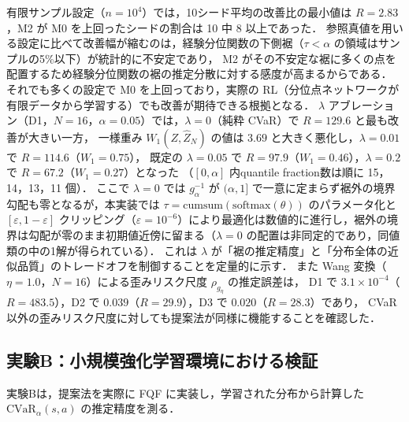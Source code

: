 \documentclass[a4paper,10pt]{jsarticle}
\theoremstyle{definition}
\newcommand{\CVaR}{\mathrm{CVaR}}
\newcommand{\Wone}{W_1}
\begin{document}
有限サンプル設定（$n=10^4$）では，10シード平均の改善比の最小値は $R=2.83$，M2 が M0 を上回ったシードの割合は 10 中 8 以上であった．
参照真値を用いる設定に比べて改善幅が縮むのは，経験分位関数の下側裾（$\tau<\alpha$ の領域はサンプルの5\%以下）が統計的に不安定であり，
M2 がその不安定な裾に多くの点を配置するため経験分位関数の裾の推定分散に対する感度が高まるからである．
それでも多くの設定で M0 を上回っており，実際の RL（分位点ネットワークが有限データから学習する）でも改善が期待できる根拠となる．
$\lambda$ アブレーション（D1，$N=16$，$\alpha=0.05$）では，$\lambda=0$（純粋 CVaR）で $R=129.6$ と最も改善が大きい一方，
一様重み $\Wone(Z,\hat Z_N)$ の値は $3.69$ と大きく悪化し，$\lambda=0.01$ で $R=114.6$（$\Wone=0.75$），
既定の $\lambda=0.05$ で $R=97.9$（$\Wone=0.46$），$\lambda=0.2$ で $R=67.2$（$\Wone=0.27$）となった
（$[0,\alpha]$ 内quantile fraction数は順に 15，14，13，11 個）．
ここで $\lambda=0$ では $g_\alpha^{-1}$ が $(\alpha,1]$ で一意に定まらず裾外の境界勾配も零となるが，本実装では $\tau=\mathrm{cumsum}(\mathrm{softmax}(\theta))$ のパラメータ化と $[\varepsilon,1-\varepsilon]$ クリッピング（$\varepsilon=10^{-6}$）により最適化は数値的に進行し，裾外の境界は勾配が零のまま初期値近傍に留まる（$\lambda=0$ の配置は非同定的であり，同値類の中の1解が得られている）．
これは $\lambda$ が「裾の推定精度」と「分布全体の近似品質」のトレードオフを制御することを定量的に示す．
また Wang 変換（$\eta=1.0$，$N=16$）による歪みリスク尺度 $\rho_{g_\eta}$ の推定誤差は，
D1 で $3.1\times10^{-4}$（$R=483.5$），D2 で $0.039$（$R=29.9$），D3 で $0.020$（$R=28.3$）であり，
CVaR 以外の歪みリスク尺度に対しても提案法が同様に機能することを確認した．

\subsection{実験B：小規模強化学習環境における検証}
\label{subsec:expB}
実験Bは，提案法を実際に FQF に実装し，学習された分布から計算した $\CVaR_\alpha(s,a)$ の推定精度を測る．
\end{document}
